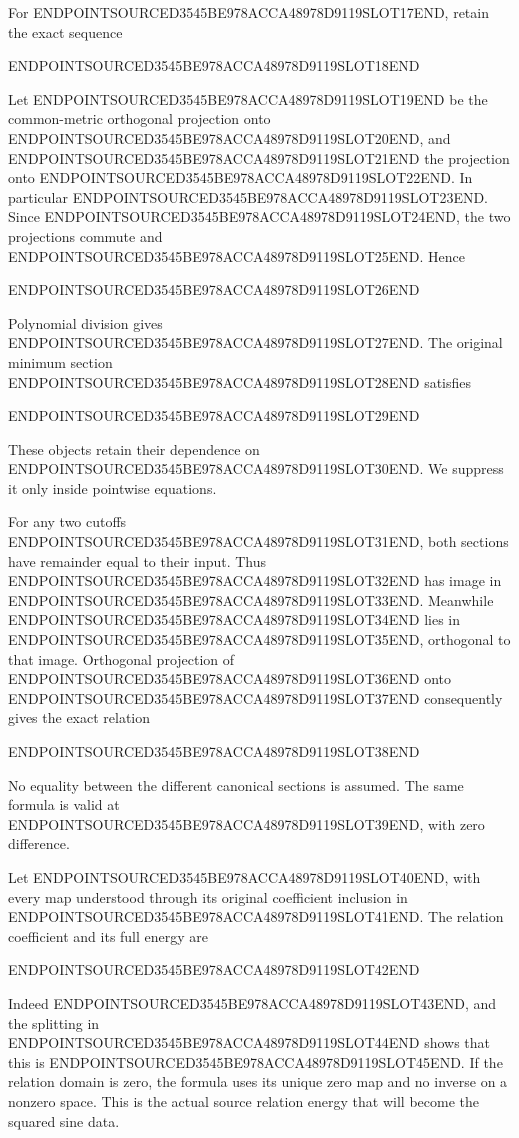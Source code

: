 For ENDPOINTSOURCED3545BE978ACCA48978D9119SLOT17END, retain the exact sequence

ENDPOINTSOURCED3545BE978ACCA48978D9119SLOT18END

Let ENDPOINTSOURCED3545BE978ACCA48978D9119SLOT19END be the common-metric orthogonal projection onto ENDPOINTSOURCED3545BE978ACCA48978D9119SLOT20END, and ENDPOINTSOURCED3545BE978ACCA48978D9119SLOT21END the projection onto ENDPOINTSOURCED3545BE978ACCA48978D9119SLOT22END. In particular ENDPOINTSOURCED3545BE978ACCA48978D9119SLOT23END. Since ENDPOINTSOURCED3545BE978ACCA48978D9119SLOT24END, the two projections commute and ENDPOINTSOURCED3545BE978ACCA48978D9119SLOT25END. Hence

ENDPOINTSOURCED3545BE978ACCA48978D9119SLOT26END

Polynomial division gives ENDPOINTSOURCED3545BE978ACCA48978D9119SLOT27END. The original minimum section ENDPOINTSOURCED3545BE978ACCA48978D9119SLOT28END satisfies

ENDPOINTSOURCED3545BE978ACCA48978D9119SLOT29END

These objects retain their dependence on ENDPOINTSOURCED3545BE978ACCA48978D9119SLOT30END. We suppress it only inside pointwise equations.

For any two cutoffs ENDPOINTSOURCED3545BE978ACCA48978D9119SLOT31END, both sections have remainder equal to their input. Thus ENDPOINTSOURCED3545BE978ACCA48978D9119SLOT32END has image in ENDPOINTSOURCED3545BE978ACCA48978D9119SLOT33END. Meanwhile ENDPOINTSOURCED3545BE978ACCA48978D9119SLOT34END lies in ENDPOINTSOURCED3545BE978ACCA48978D9119SLOT35END, orthogonal to that image. Orthogonal projection of ENDPOINTSOURCED3545BE978ACCA48978D9119SLOT36END onto ENDPOINTSOURCED3545BE978ACCA48978D9119SLOT37END consequently gives the exact relation

ENDPOINTSOURCED3545BE978ACCA48978D9119SLOT38END

No equality between the different canonical sections is assumed. The same formula is valid at ENDPOINTSOURCED3545BE978ACCA48978D9119SLOT39END, with zero difference.

Let ENDPOINTSOURCED3545BE978ACCA48978D9119SLOT40END, with every map understood through its original coefficient inclusion in ENDPOINTSOURCED3545BE978ACCA48978D9119SLOT41END. The relation coefficient and its full energy are

ENDPOINTSOURCED3545BE978ACCA48978D9119SLOT42END

Indeed ENDPOINTSOURCED3545BE978ACCA48978D9119SLOT43END, and the splitting in ENDPOINTSOURCED3545BE978ACCA48978D9119SLOT44END shows that this is ENDPOINTSOURCED3545BE978ACCA48978D9119SLOT45END. If the relation domain is zero, the formula uses its unique zero map and no inverse on a nonzero space. This is the actual source relation energy that will become the squared sine data.

